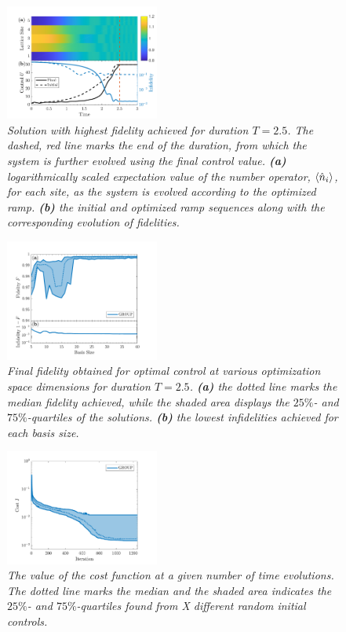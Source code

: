 \documentclass[%
 reprint,
 amsmath,amssymb,
 aps,
pra,
]{revtex4-1}
\begin{document}
\begin{figure}[h!]
    \centering
    \includegraphics[width=0.45\textwidth]{Figures/OptRamp.pdf}
    \caption{\textit{Solution with highest fidelity achieved for duration $T = 2.5$. The dashed, red line marks the end of the duration, from which the system is further evolved using the final control value. \textbf{(a)} logarithmically scaled expectation value of the number operator, $\braket{\hat{n}_i}$, for each site, as the system is evolved according to the optimized ramp. \textbf{(b)} the initial and optimized ramp sequences along with the corresponding evolution of fidelities.}}
    \label{fig:OptRamp}
\end{figure}

\begin{figure}[h!]
    \centering
    \includegraphics[width=0.45\textwidth]{Figures/FidelityBasisSize.pdf}
    \caption{\textit{Final fidelity obtained for optimal control at various optimization space dimensions for duration $T = 2.5$. \textbf{(a)} the dotted line marks the median fidelity achieved, while the shaded area displays the $25\%$- and $75\%$-quartiles of the solutions. \textbf{(b)} the lowest infidelities achieved for each basis size.}}
    \label{fig:FidelityBasisSize}
\end{figure}

\begin{figure}[h!]
    \centering
    \includegraphics[width=0.45\textwidth]{Figures/CostProgress.pdf}
    \caption{\textit{The value of the cost function at a given number of time evolutions. The dotted line marks the median and the shaded area indicates the $25\%$- and $75\%$-quartiles found from X different random initial controls.}}
    \label{fig:FidelityBasisSize5}
\end{figure}


%

\end{document}
